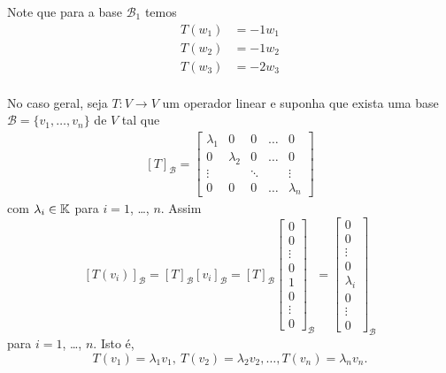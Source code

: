 Note que para a base $\mathcal{B}_1$ temos
\begin{align*}
    T(w_1) &= -1w_1\\
    T(w_2) &= -1w_2\\
    T(w_3) &= -2w_3\\
\end{align*}

No caso geral, seja $T : V \to V$ um operador linear e suponha que exista uma base $\mathcal{B} = \{v_1,\dots,v_n\}$ de $V$ tal que
\begin{align}\label{formadiagonal}
    [T]_\mathcal{B} = \begin{bmatrix}
        \lambda_1 & 0 & 0 & \dots & 0\\
        0 & \lambda_2 & 0 & \dots & 0\\
        \vdots & & \ddots & & \vdots\\
        0 & 0 & 0 & \dots & \lambda_n
    \end{bmatrix}
\end{align}
com $\lambda_i \in \mathbb{K}$ para $i = 1$, \dots, $n$. Assim
\[
    [T(v_i)]_\mathcal{B} = [T]_\mathcal{B}[v_i]_\mathcal{B} = [T]_\mathcal{B}\begin{bmatrix}
        0\\
        0\\
        \vdots\\
        0\\
        1\\
        0\\
        \vdots\\
        0
    \end{bmatrix}_\mathcal{B} = \begin{bmatrix}
        0\\
        0\\
        \vdots\\
        0\\
        \lambda_i\\
        0\\
        \vdots\\
        0
    \end{bmatrix}_\mathcal{B}
\]
para $i = 1$, \dots, $n$. Isto \'e,
\[
    T(v_1) = \lambda_1 v_1,\ T(v_2) = \lambda_2 v_2,\dots, T(v_n) = \lambda_n v_n.
\]

